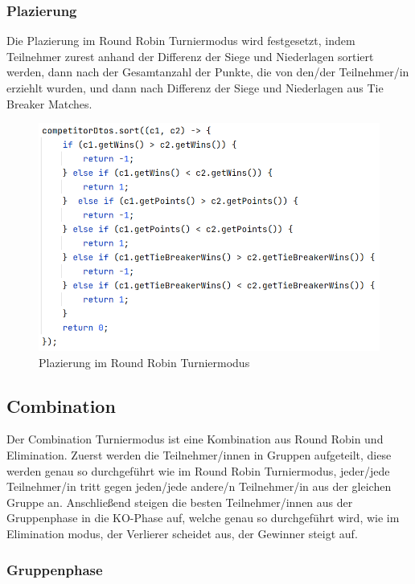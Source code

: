 \subsubsection{Plazierung}

Die Plazierung im Round Robin Turniermodus wird festgesetzt, indem Teilnehmer zurest anhand der Differenz der Siege und Niederlagen sortiert werden, dann nach 
der Gesamtanzahl der Punkte, die von den/der Teilnehmer/in erziehlt wurden, und dann nach Differenz der Siege und Niederlagen aus Tie Breaker Matches.

\begin{figure}[H]
    \includegraphics[scale=0.6]{pics/backend/roundrobin/roundrobin_rankCompetitors.png}
    \caption{Plazierung im Round Robin Turniermodus}
\end{figure}

\subsection{Combination}

Der Combination Turniermodus ist eine Kombination aus Round Robin und Elimination. Zuerst werden die Teilnehmer/innen in Gruppen aufgeteilt, diese werden genau so durchgeführt wie im Round Robin Turniermodus, 
jeder/jede Teilnehmer/in tritt gegen jeden/jede andere/n Teilnehmer/in aus der gleichen Gruppe an. Anschließend steigen die besten Teilnehmer/innen aus der Gruppenphase in die KO-Phase auf, welche genau  so 
durchgeführt wird, wie im Elimination modus, der Verlierer scheidet aus, der Gewinner steigt auf.

\subsubsection{Gruppenphase}

